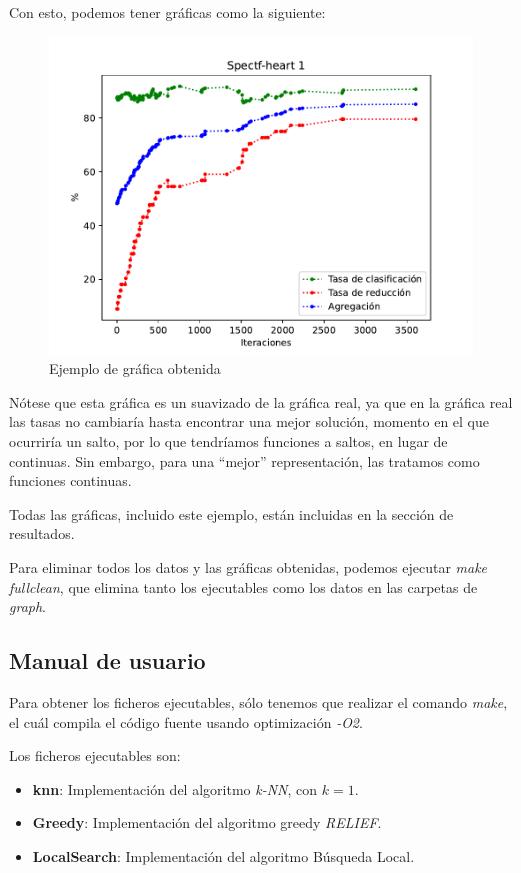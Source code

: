 \documentclass[11pt,a4paper]{article}
\begin{document}
Con esto, podemos tener gráficas como la siguiente:
\begin{figure}[H]
	\includegraphics[scale=1]{../FUENTES/graph/plots/spectf-heart1.pdf}
	\caption{Ejemplo de gráfica obtenida}
\end{figure}
Nótese que esta gráfica es un suavizado de la gráfica real, ya que en la gráfica real las tasas no cambiaría hasta encontrar una mejor solución, momento en el que ocurriría un salto, por lo que tendríamos funciones a saltos, en lugar de continuas. Sin embargo, para una ``mejor'' representación, las tratamos como funciones continuas.

Todas las gráficas, incluido este ejemplo, están incluidas en la sección de resultados.

Para eliminar todos los datos y las gráficas obtenidas, podemos ejecutar \emph{make fullclean}, que elimina tanto los ejecutables como los datos en las carpetas de \emph{graph}.

\subsection{Manual de usuario}

Para obtener los ficheros ejecutables, sólo tenemos que realizar el comando \emph{make}, el cuál compila el código fuente usando optimización \emph{-O2}.

Los ficheros ejecutables son:
\begin{itemize}
\item \textbf{knn}: Implementación del algoritmo \emph{k-NN}, con $k = 1$.
\item \textbf{Greedy}: Implementación del algoritmo greedy \emph{RELIEF}.
\item \textbf{LocalSearch}: Implementación del algoritmo Búsqueda Local.
\end{itemize}
\end{document}
